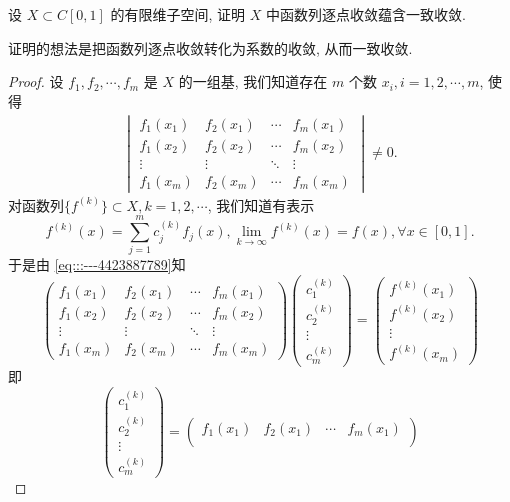 \documentclass[../../main.tex]{subfiles}%
\begin{document}
\begin{example}
设 \( X \subset C[0,1] \) 的有限维子空间, 证明 \( X \) 中函数列逐点收敛蕴含一致收敛.
\end{example}
\begin{note}
证明的想法是把函数列逐点收敛转化为系数的收敛, 从而一致收敛.
\end{note}
\begin{proof}
设 \( f_1, f_2, \cdots, f_m \) 是 \( X \) 的一组基, 我们知道存在 \( m \) 个数 \( x_i, i = 1, 2, \cdots, m \), 使得
\begin{align}
\begin{vmatrix}
f_1(x_1) & f_2(x_1) & \cdots & f_m(x_1) \\
f_1(x_2) & f_2(x_2) & \cdots & f_m(x_2) \\
\vdots & \vdots & \ddots & \vdots \\
f_1(x_m) & f_2(x_m) & \cdots & f_m(x_m)
\end{vmatrix} \neq 0. \label{eq:::---4423887789}
\end{align}
对函数列\(\{f^{(k)}\} \subset X, k = 1, 2, \cdots \), 我们知道有表示
\[
f^{(k)}(x) = \sum_{j=1}^m c_j^{(k)} f_j(x), \lim_{k \to \infty} f^{(k)}(x) = f(x), \forall x \in [0,1].
\]
于是由 \eqref{eq:::---4423887789}知
\[
\begin{pmatrix}
f_1(x_1) & f_2(x_1) & \cdots & f_m(x_1) \\
f_1(x_2) & f_2(x_2) & \cdots & f_m(x_2) \\
\vdots & \vdots & \ddots & \vdots \\
f_1(x_m) & f_2(x_m) & \cdots & f_m(x_m)
\end{pmatrix}
\begin{pmatrix}
c_1^{(k)} \\
c_2^{(k)} \\
\vdots \\
c_m^{(k)}
\end{pmatrix}
=
\begin{pmatrix}
f^{(k)}(x_1) \\
f^{(k)}(x_2) \\
\vdots \\
f^{(k)}(x_m)
\end{pmatrix}
\]
即
\[
\begin{pmatrix}
c_1^{(k)} \\
c_2^{(k)} \\
\vdots \\
c_m^{(k)}
\end{pmatrix}
=
\begin{pmatrix}
f_1(x_1) & f_2(x_1) & \cdots & f_m(x_1) \\

\end{pmatrix}\]
\end{proof}
\end{document}
